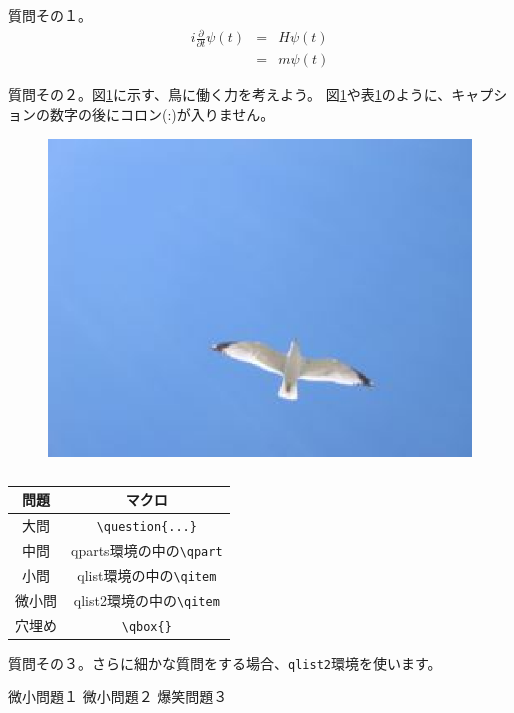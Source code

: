 \documentclass[dvipdfmx,11pt,a4j]{jarticle}
\begin{document}
\begin{qlist}

	\qitem 質問その１。
		\begin{eqnarray}
			i \frac{\partial}{\partial t} \psi(t) & = & H \psi(t) \\
									& = & m \psi(t)
		\end{eqnarray}

	\qitem 質問その２。図\ref{fig:seagull}に示す、鳥に働く力を考えよう。
		図\ref{fig:seagull}や表\ref{tab:macros}のように、キャプションの数字の後にコロン(:)が入りません。
		\begin{figure}[htbp]
			\begin{center}
				\includegraphics[width=0.3\linewidth]{seagull2.eps}
				\caption{\label{fig:seagull}}
			\end{center}
		\end{figure}

		\begin{table}[htbp]
			\centering
			\caption{\label{tab:macros}}
			\begin{tabular}{|c|c|}
				\hline
				問題 & マクロ\\
				\hline
				大問	& \verb"\question{...}"\\
				中問 & qparts環境の中の\verb"\qpart"\\
				小問	& qlist環境の中の\verb"\qitem"\\
				微小問 & qlist2環境の中の\verb"\qitem"\\
				穴埋め & \verb"\qbox{}"\\
				\hline
			\end{tabular}
		\end{table}
	
	\qitem 質問その３。さらに細かな質問をする場合、{\tt qlist2}環境を使います。
		\begin{qlist2}
			\qitem 微小問題１
			\qitem 微小問題２
			\qitem 爆笑問題３
		\end{qlist2}
\end{qlist}

\clearpage
{}
\end{document}
